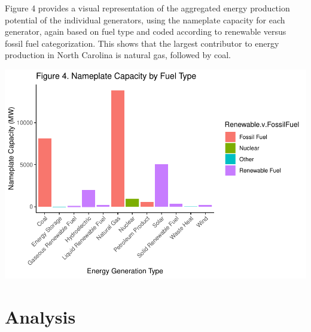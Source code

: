 \documentclass[
  12pt,
]{article}
\begin{document}
Figure 4 provides a visual representation of the aggregated energy
production potential of the individual generators, using the nameplate
capacity for each generator, again based on fuel type and coded
according to renewable versus fossil fuel categorization. This shows
that the largest contributor to energy production in North Carolina is
natural gas, followed by coal.

\includegraphics{Project_files/figure-latex/unnamed-chunk-4-1.pdf}

\newpage

\hypertarget{analysis}{%
\section{Analysis}\label{analysis}}
\end{document}
